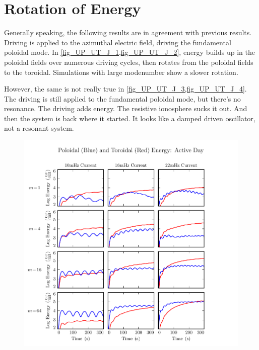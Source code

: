\section{Rotation of Energy}

Generally speaking, the following results are in agreement with previous results. Driving is applied to the azimuthal electric field, driving the fundamental poloidal mode. In \cref{fig_UP_UT_J_1,fig_UP_UT_J_2}, energy builds up in the poloidal fields over numerous driving cycles, then rotates from the poloidal fields to the toroidal. Simulations with large modenumber show a slower rotation. 

However, the same is not really true in \cref{fig_UP_UT_J_3,fig_UP_UT_J_4}. The driving is still applied to the fundamental poloidal mode, but there's no resonance. The driving adds energy. The resistive ionosphere sucks it out. And then the system is back where it started. It looks like a damped driven oscillator, not a resonant system. 

\begin{figure}[H]
    \centering
    \includegraphics[width=\textwidth]{figures/UP_UT_J_1.pdf}
    \caption[Current-Driven Poloidal and Toroidal Energy: Active Day]{}
    \label{fig_UP_UT_J_1}
\end{figure}


